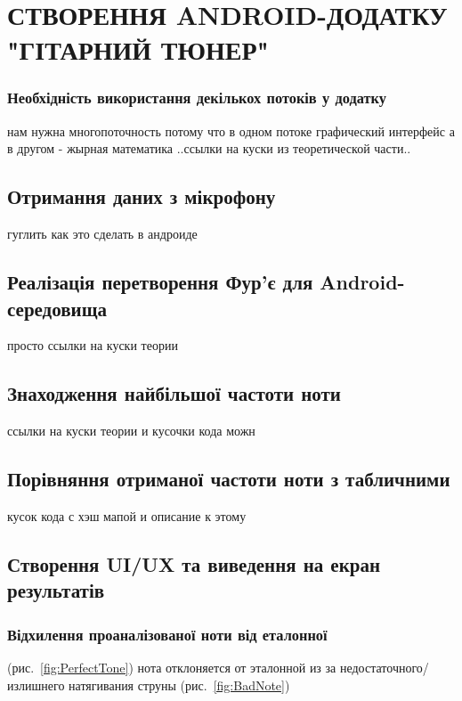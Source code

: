 \section{СТВОРЕННЯ ANDROID-ДОДАТКУ "ГІТАРНИЙ ТЮНЕР"}

\subsubsection{Необхідність використання декількох потоків у додатку}

нам нужна многопоточность потому что в одном потоке графический интерфейс а в другом - жырная математика
..ссылки на куски из теоретической части..

\subsection{Отримання даних з мікрофону}

гуглить как это сделать в андроиде

\subsection{Реалізація перетворення Фур'є для Android-середовища}

просто ссылки на куски теории

\subsection{Знаходження найбільшої частоти ноти}

ссылки на куски теории и кусочки кода можн

\subsection{Порівняння отриманої частоти ноти з табличними}

кусок кода с хэш мапой и описание к этому

\subsection{Створення UI/UX та виведення на екран результатів}


\subsubsection{Відхилення проаналізованої ноти від еталонної}
(рис.~\ref{fig:PerfectTone})
\lipsum[1]
\lipsum[1]
нота отклоняется от эталонной из за недостаточного/излишнего натягивания струны (рис.~\ref{fig:BadNote})

